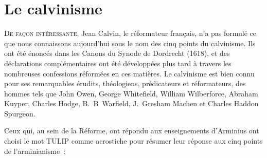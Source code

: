\chapter{Le calvinisme}

\begin{pocketpar}{}
\begin{digestpar}{}
\lettrine{D}{e façon intéressante,} Jean Calvin, le réformateur français, n'a pas formulé
 ce que nous con\-naissons au\-jour\-d'hui sous le nom des cinq points du calvinisme.
 Ils ont été énoncés dans les Canons du Synode de Dordrecht (1618), et des déclarations
 complémentaires ont été développées plus tard à travers les nombreuses
 confessions réformées en ces matières. Le calvinisme est bien connu
 pour 
 ses remarquables érudits, théologiens, prédicateurs et réformateurs,
 des hommes tels que John Owen, George Whitefield,
 William Wilberforce, Abraham Kuyper, Charles Hodge,\pocketlinebreak
 B.~B~Warfield, J.~Gresham Machen et
 Charles Haddon Spurgeon.
\end{digestpar}
\end{pocketpar}

Ceux qui, au sein de la Réforme, ont répondu aux enseignements d'Arminius
 ont choisi le mot \og TULIP \fg{} comme acrostiche pour résumer
 leur réponse aux cinq points de l'arminianisme~:

